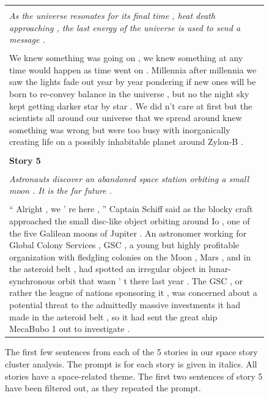 \documentclass{article}
\begin{document}
\begin{figure}[h]
\begin{tabular}{|p{\textwidth}|}
\\
\hline
\\
\textit{As the universe resonates for its final time , heat death approaching , the last energy of the universe is used to send a message .}
\\
\\
We knew something was going on , we knew something at any time would happen as time went on .
Millennia after millennia we saw the lights fade out year by year pondering if new ones will be born to re-convey balance in the universe , but no the night sky kept getting darker star by star .
We did n't care at first but the scientists all around our universe that we spread around knew something was wrong but were too busy with inorganically creating life on a possibly inhabitable planet around Zylon-B .
\\
\\
\hline
\textbf{Story 5}
\\
\hline
\\
\textit{Astronauts discover an abandoned space station orbiting a small moon . It is the far future .}
\\
\\
“ Alright , we ’ re here , ” Captain Schiff said as the blocky craft approached the small disc-like object orbiting around Io , one of the five Galilean moons of Jupiter .
An astronomer working for Global Colony Services , GSC , a young but highly profitable organization with fledgling colonies on the Moon , Mars , and in the asteroid belt , had spotted an irregular object in lunar-synchronous orbit that wasn ’ t there last year .
The GSC , or rather the league of nations sponsoring it , was concerned about a potential threat to the admittedly massive investments it had made in the asteroid belt , so it had sent the great ship MecaBubo 1 out to investigate .
\\
\hline
\end{tabular}
\caption{
\label{fig:story-starts}
The first few sentences from each of the 5 stories in our space story cluster analysis.
The prompt is for each story is given in italics.
All stories have a space-related theme.
The first two sentences of story 5 have been filtered out, as they repeated the prompt.
}
\end{figure}
\end{document}
